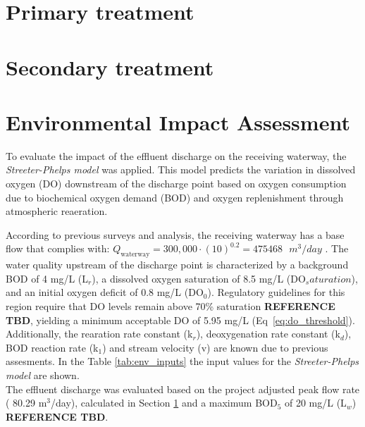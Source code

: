 \documentclass[12pt]{article}
\begin{document}
\newpage

\section{Primary treatment}
\label{sec:primary_treat}
\newpage

\section{Secondary treatment}
\newpage


\section{Environmental Impact Assessment}
\label{sec:env_impact}

To evaluate the impact of the effluent discharge on the receiving waterway, 
the \textit{Streeter-Phelps model} was applied. This model predicts the variation in dissolved 
oxygen (DO) downstream of the discharge point based on oxygen consumption due to biochemical 
oxygen demand (BOD) and oxygen replenishment through atmospheric reaeration.

According to previous surveys and analysis, the receiving waterway has a base flow that complies
with: 
\(Q_{\text{waterway}} = 300{,}000 \cdot \left(\text{10}\right)^{0.2} = 475468 \text{ } m^3/day\)
. The water quality upstream 
of the discharge point is characterized by a background BOD of 4 mg/L (L$_r$), a dissolved oxygen saturation 
of 8.5 mg/L (DO$_saturation$), and an initial oxygen deficit of 0.8 mg/L (DO$_0$). Regulatory guidelines for this region require 
that DO levels remain above 70\% saturation \textbf{REFERENCE TBD}, yielding a minimum acceptable DO of 5.95 mg/L (Eq~\eqref{eq:do_threshold}).
Additionally, the rearation rate constant (k$_r$), deoxygenation rate constant (k$_d$), BOD reaction rate
(k$_1$) and stream velocity (v) are known due to previous assesments. In the Table \ref{tab:env_inputs} the
input values for the \textit{Streeter-Phelps model} are shown.\\

The effluent discharge was evaluated based on the project adjusted 
peak flow rate (
80.29
m$^3$/day), calculated in Section \ref{sec:primary_treat} and a maximum BOD$_5$ of 20 mg/L (L$_w$) 
\textbf{REFERENCE TBD}. 
\end{document}
